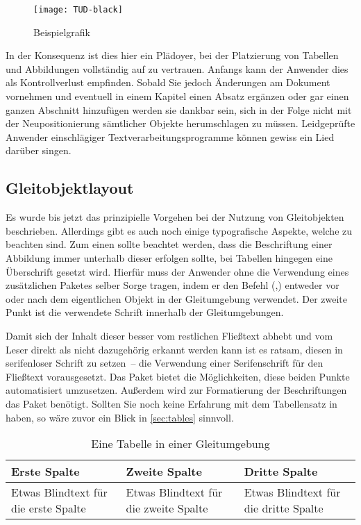 \documentclass[%
  english,ngerman,%
  cdgeometry=no,DIV=12,%
  automark,%
  listof=toc,%
]{tudscrartcl}
\begin{document}
\begin{Trunk}
\begin{figure}
\centering
\texttt{[image: TUD-black]}
\caption{Beispielgrafik}\label{fig:example}
\end{figure}

\end{Trunk}
\InputCode\noindent
%
In der Konsequenz ist dies hier ein Plädoyer, bei der Platzierung von Tabellen 
und Abbildungen vollständig auf  zu vertrauen. Anfangs kann der 
Anwender dies als Kontrollverlust empfinden. Sobald Sie jedoch Änderungen am 
Dokument vornehmen und eventuell in einem Kapitel einen Absatz ergänzen oder 
gar einen ganzen Abschnitt hinzufügen werden sie dankbar sein, sich in der 
Folge nicht mit der Neupositionierung sämtlicher Objekte herumschlagen zu 
müssen. Leidgeprüfte Anwender einschlägiger Textverarbeitungsprogramme können 
gewiss ein Lied darüber singen.


\subsection{Gleitobjektlayout}
\label{sec:floatlayout}%
%
Es wurde bis jetzt das prinzipielle Vorgehen bei der Nutzung von Gleitobjekten 
beschrieben. Allerdings gibt es auch noch einige typografische Aspekte, welche 
zu beachten sind. Zum einen sollte beachtet werden, dass die Beschriftung einer 
Abbildung immer unterhalb dieser erfolgen sollte, bei Tabellen hingegen eine 
Überschrift gesetzt wird. Hierfür muss der Anwender ohne die Verwendung eines 
zusätzlichen Paketes selber Sorge tragen, indem er den Befehl 
(,) entweder vor oder 
nach dem eigentlichen Objekt in der Gleitumgebung verwendet. Der zweite Punkt 
ist die verwendete Schrift innerhalb der Gleitumgebungen. 

Damit sich der Inhalt dieser besser vom restlichen Fließtext abhebt und vom 
Leser direkt als nicht dazugehörig erkannt werden kann ist es ratsam, diesen in 
serifenloser Schrift zu setzen~-- die Verwendung einer Serifenschrift für den 
Fließtext vorausgesetzt. Das Paket  bietet die Möglichkeiten, 
diese beiden Punkte automatisiert umzusetzen. Außerdem wird zur Formatierung 
der Beschriftungen das Paket  benötigt. Sollten Sie noch keine 
Erfahrung mit dem Tabellensatz in  haben, so wäre zuvor ein 
Blick in \autoref{sec:tables} sinnvoll. 

\newcommand*\tableexample[1][]{%
  \begin{tabularx}{.75\textwidth}{@{}XXX@{}}
  \toprule
  \textbf{Erste Spalte} & \textbf{Zweite Spalte} & 
  \textbf{Dritte Spalte} \tabularnewline\midrule
  Etwas Blindtext für die erste Spalte &
  Etwas Blindtext für die zweite Spalte &
  Etwas Blindtext für die dritte Spalte
  \tabularnewline\bottomrule
  \end{tabularx}
  #1%
}
\begin{table}
\tableexample[%
  \caption{Eine Tabelle in einer Gleitumgebung}\label{tab:tabular}%
]
\end{table}
\end{document}
